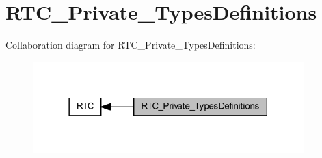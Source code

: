 \hypertarget{group___r_t_c___private___types_definitions}{}\section{R\+T\+C\+\_\+\+Private\+\_\+\+Types\+Definitions}
\label{group___r_t_c___private___types_definitions}
Collaboration diagram for R\+T\+C\+\_\+\+Private\+\_\+\+Types\+Definitions\+:
\nopagebreak
\begin{figure}[H]
\begin{center}
\leavevmode
\includegraphics[width=297pt]{group___r_t_c___private___types_definitions}
\end{center}
\end{figure}
